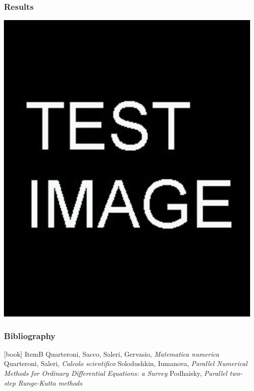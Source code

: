 \documentclass{beamer}
\begin{document}
\begin{frame} %
	\frametitle{Results}
	\includegraphics[scale=0.3]{etc/test.jpg}
\end{frame}

\begin{frame} %
	\frametitle{Bibliography}
	\begin{thebibliography}
		\bibitem ItemB Quarteroni, Sacco, Saleri, Gervasio, \textit{Matematica numerica}
		\bibitem Quarteroni, Saleri, \textit{Calcolo scientifico}
		\bibitem Solodushkin, Iumanova, \textit{Parallel Numerical Methods for Ordinary Differential Equations: a Survey}
		\bibitem Podhaisky, \textit{Parallel two-step Runge-Kutta methods}	
	\end{thebibliography}
\end{frame}
\end{document}
